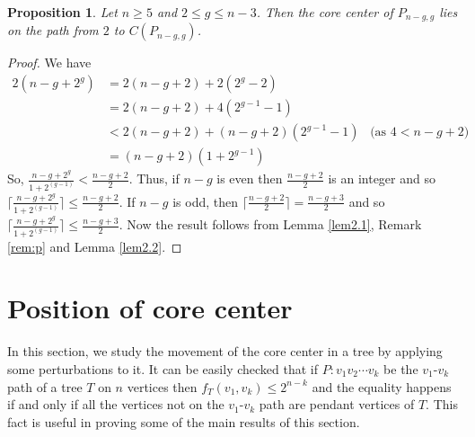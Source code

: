 \documentclass[11pt]{article}
\newtheorem{proposition}[theorem]{Proposition}
\begin{document}
\begin{proposition}\label{prop3}
Let $n\geq 5$ and $2\leq g \leq n-3$. Then the core center of $P_{n-g,g}$ lies on the path from  $2$ to  $C(P_{n-g,g})$.
\end{proposition}
\begin{proof}
We have 
\begin{align*}
2(n-g+2^g)&= 2(n-g+2)+2(2^g-2)\\
          &=2(n-g+2)+4(2^{g-1}-1)\\
          &<2(n-g+2)+(n-g+2)(2^{g-1}-1)\;\;\;\mbox{(as $4<n-g+2$)}\\
          &=(n-g+2)(1+2^{g-1})
\end{align*}
So, $\frac{n-g+2^g}{1+2^{(g-1)}}<\frac{n-g+2}{2}.$ Thus, if $n-g$ is even then $\frac{n-g+2}{2}$ is an integer and so $\lceil \frac{n-g+2^g}{1+2^{(g-1)}} \rceil\leq \frac{n-g+2}{2}$. If $n-g$ is odd, then  $\lceil \frac{n-g+2}{2} \rceil=\frac{n-g+3}{2}$ and so $\lceil \frac{n-g+2^g}{1+2^{(g-1)}} \rceil\leq \frac{n-g+3}{2}$. Now the result follows from Lemma \ref{lem2.1}, Remark \ref{rem:p} and Lemma \ref{lem2.2}.
\end{proof}


\section{Position of core center}\label{pcc}

In this section, we study the movement of the core center in  a tree by applying some perturbations to it. It can be easily checked that if $P:v_1v_2\cdots v_k$ be the $v_1$-$v_k$ path of a tree $T$ on $n$ vertices then $f_T(v_1,v_k)\leq 2^{n-k}$ and the equality happens if and only if all the vertices not on the $v_1$-$v_k$ path are pendant vertices of $T$. This fact is useful in proving some of the main results of this section.
\end{document}
